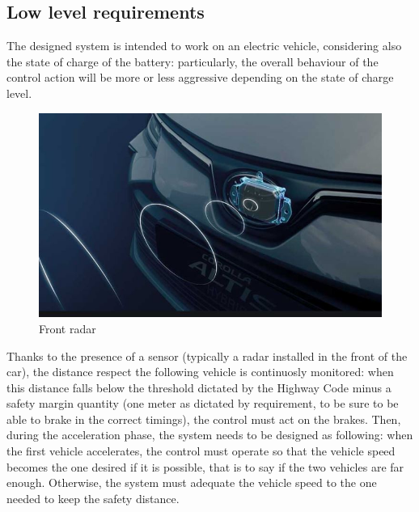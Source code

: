 \documentclass[12pt,a4paper]{report}
\begin{document}
\subsection{Low level requirements}
The designed system is intended to work on an electric vehicle, considering also the state of charge of the battery: particularly, the overall behaviour of the control action will be more or less aggressive depending on the state of charge level.

\begin{figure}[htbp]
	\centering
	\includegraphics{RadarACC.jpg}
	\caption{Front radar}
\end{figure}

Thanks to the presence of a sensor (typically a radar installed in the front of the car), the distance respect the following vehicle is continuosly monitored: when this distance falls below the threshold dictated by the Highway Code minus a safety margin quantity (one meter as dictated by requirement, to be sure to be able to brake in the correct timings), the control must act on the brakes. Then, during the acceleration phase, the system needs to be designed as following: when the first vehicle accelerates, the control must operate so that the vehicle speed becomes the one desired if it is possible,  that is to say if the two vehicles are far enough. Otherwise, the system must adequate the vehicle speed to the one needed to keep the safety distance.
\end{document}
